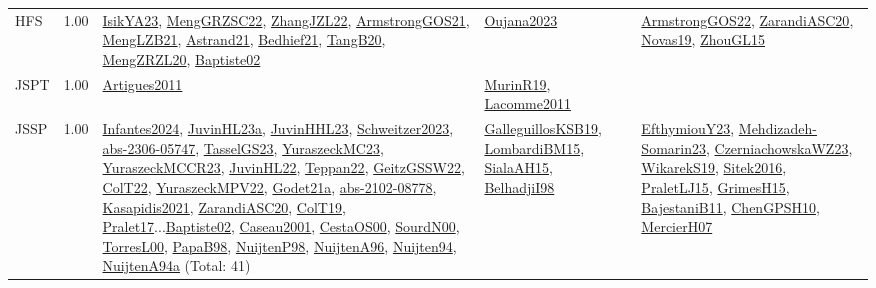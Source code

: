 {\begin{longtable}{p{3cm}r>{\raggedright\arraybackslash}p{6cm}>{\raggedright\arraybackslash}p{6cm}>{\raggedright\arraybackslash}p{8cm}}
\index{HFS}\index{Classification!HFS}HFS &  1.00 & \hyperref[detail:IsikYA23]{IsikYA23}, \hyperref[detail:MengGRZSC22]{MengGRZSC22}, \hyperref[detail:ZhangJZL22]{ZhangJZL22}, \hyperref[detail:ArmstrongGOS21]{ArmstrongGOS21}, \hyperref[detail:MengLZB21]{MengLZB21}, \hyperref[detail:Astrand21]{Astrand21}, \hyperref[detail:Bedhief21]{Bedhief21}, \hyperref[detail:TangB20]{TangB20}, \hyperref[detail:MengZRZL20]{MengZRZL20}, \hyperref[detail:Baptiste02]{Baptiste02} & \hyperref[detail:Oujana2023]{Oujana2023} & \hyperref[detail:ArmstrongGOS22]{ArmstrongGOS22}, \hyperref[detail:ZarandiASC20]{ZarandiASC20}, \hyperref[detail:Novas19]{Novas19}, \hyperref[detail:ZhouGL15]{ZhouGL15}\\
\index{JSPT}\index{Classification!JSPT}JSPT &  1.00 & \hyperref[detail:Artigues2011]{Artigues2011} & \hyperref[detail:MurinR19]{MurinR19}, \hyperref[detail:Lacomme2011]{Lacomme2011} & \\
\index{JSSP}\index{Classification!JSSP}JSSP &  1.00 & \hyperref[detail:Infantes2024]{Infantes2024}, \hyperref[detail:JuvinHL23a]{JuvinHL23a}, \hyperref[detail:JuvinHHL23]{JuvinHHL23}, \hyperref[detail:Schweitzer2023]{Schweitzer2023}, \hyperref[detail:abs-2306-05747]{abs-2306-05747}, \hyperref[detail:TasselGS23]{TasselGS23}, \hyperref[detail:YuraszeckMC23]{YuraszeckMC23}, \hyperref[detail:YuraszeckMCCR23]{YuraszeckMCCR23}, \hyperref[detail:JuvinHL22]{JuvinHL22}, \hyperref[detail:Teppan22]{Teppan22}, \hyperref[detail:GeitzGSSW22]{GeitzGSSW22}, \hyperref[detail:ColT22]{ColT22}, \hyperref[detail:YuraszeckMPV22]{YuraszeckMPV22}, \hyperref[detail:Godet21a]{Godet21a}, \hyperref[detail:abs-2102-08778]{abs-2102-08778}, \hyperref[detail:Kasapidis2021]{Kasapidis2021}, \hyperref[detail:ZarandiASC20]{ZarandiASC20}, \hyperref[detail:ColT19]{ColT19}, \hyperref[detail:Pralet17]{Pralet17}...\hyperref[detail:Baptiste02]{Baptiste02}, \hyperref[detail:Caseau2001]{Caseau2001}, \hyperref[detail:CestaOS00]{CestaOS00}, \hyperref[detail:SourdN00]{SourdN00}, \hyperref[detail:TorresL00]{TorresL00}, \hyperref[detail:PapaB98]{PapaB98}, \hyperref[detail:NuijtenP98]{NuijtenP98}, \hyperref[detail:NuijtenA96]{NuijtenA96}, \hyperref[detail:Nuijten94]{Nuijten94}, \hyperref[detail:NuijtenA94a]{NuijtenA94a} (Total: 41) & \hyperref[detail:GalleguillosKSB19]{GalleguillosKSB19}, \hyperref[detail:LombardiBM15]{LombardiBM15}, \hyperref[detail:SialaAH15]{SialaAH15}, \hyperref[detail:BelhadjiI98]{BelhadjiI98} & \hyperref[detail:EfthymiouY23]{EfthymiouY23}, \hyperref[detail:Mehdizadeh-Somarin23]{Mehdizadeh-Somarin23}, \hyperref[detail:CzerniachowskaWZ23]{CzerniachowskaWZ23}, \hyperref[detail:WikarekS19]{WikarekS19}, \hyperref[detail:Sitek2016]{Sitek2016}, \hyperref[detail:PraletLJ15]{PraletLJ15}, \hyperref[detail:GrimesH15]{GrimesH15}, \hyperref[detail:BajestaniB11]{BajestaniB11}, \hyperref[detail:ChenGPSH10]{ChenGPSH10}, \hyperref[detail:MercierH07]{MercierH07}\\

\end{longtable}}
